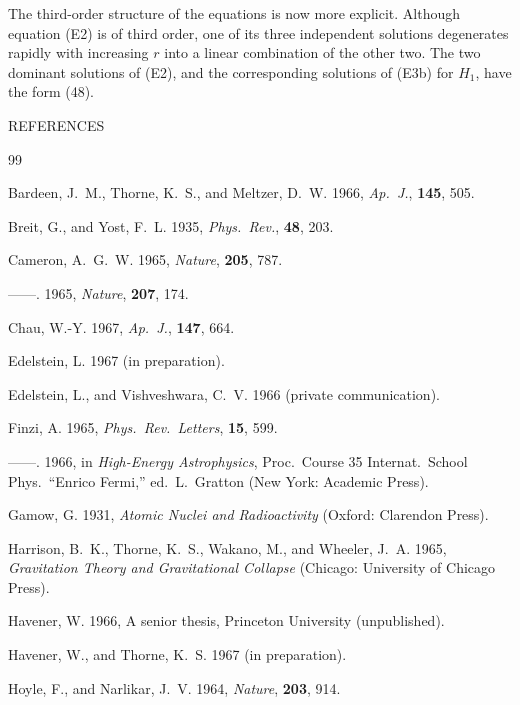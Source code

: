 The third-order structure of the equations is now more explicit. Although equation (E2) is of
third order, one of its three independent solutions degenerates rapidly with increasing $r$ into a
linear combination of the other two. The two dominant solutions of (E2), and the corresponding
solutions of (E3b) for $H_1$, have the form (48).

\begin{center}
REFERENCES
\end{center}

\begin{thebibliography}{99}

Bardeen, J.~M., Thorne, K.~S., and Meltzer, D.~W. 1966, \textit{Ap.~J.}, \textbf{145}, 505.

Breit, G., and Yost, F.~L. 1935, \textit{Phys.~Rev.}, \textbf{48}, 203.

Cameron, A.~G.~W. 1965, \textit{Nature}, \textbf{205}, 787.

------. 1965, \textit{Nature}, \textbf{207}, 174.

Chau, W.-Y. 1967, \textit{Ap.~J.}, \textbf{147}, 664.

Edelstein, L. 1967 (in preparation).

Edelstein, L., and Vishveshwara, C.~V. 1966 (private communication).

Finzi, A. 1965, \textit{Phys.~Rev.~Letters}, \textbf{15}, 599.

------. 1966, in \textit{High-Energy Astrophysics}, Proc.\ Course 35 Internat.\ School Phys.\ ``Enrico Fermi,'' ed.\ L.\ Gratton (New York: Academic Press).

Gamow, G. 1931, \textit{Atomic Nuclei and Radioactivity} (Oxford: Clarendon Press).

Harrison, B.~K., Thorne, K.~S., Wakano, M., and Wheeler, J.~A. 1965, \textit{Gravitation Theory and Gravitational Collapse} (Chicago: University of Chicago Press).

Havener, W. 1966, A senior thesis, Princeton University (unpublished).

Havener, W., and Thorne, K.~S. 1967 (in preparation).

Hoyle, F., and Narlikar, J.~V. 1964, \textit{Nature}, \textbf{203}, 914.


\end{thebibliography}
